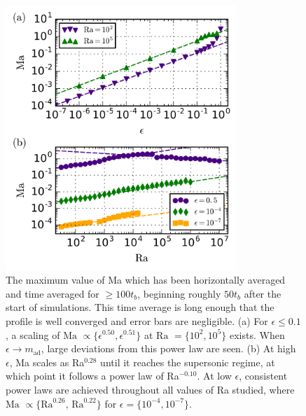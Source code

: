 \documentclass[aps, prl, twocolumn, nofootinbib, groupedaddress, amsfonts, amssymb, amsmath]{revtex4-1}
\begin{document}
\begin{figure}[t]
\includegraphics[width=3.4375in]{./figs/ma_v_eps.png}
\caption{The maximum value of Ma which has been horizontally 
averaged and time averaged for $\geq 100 t_b$, 
beginning roughly $50t_b$ after
the start of simulations.  This time average is long 
enough that the profile is well converged
and error bars are negligible. (a) For $\epsilon \leq 0.1$,
a scaling of $\text{Ma }\propto \{\epsilon^{0.50}, \epsilon^{0.51}\}$ 
at $\text{Ra }= \{10^2, 10^5\}$ exists.
When $\epsilon \rightarrow m_{\text{ad}}$, 
large deviations from this power law are seen.  
(b) At high $\epsilon$, Ma scales as Ra$^{0.28}$ 
until it reaches the supersonic regime, at which point it
follows a power law of Ra$^{-0.10}$.  At low $\epsilon$, 
consistent power laws are achieved throughout all
values of Ra studied, where 
$\text{Ma }\propto \{\text{Ra}^{0.26},\,\text{Ra}^{0.22}\}$
for $\epsilon = \{10^{-4}, 10^{-7}\}$. 
\label{fig:ma_v_eps} }
\end{figure}
\end{document}
